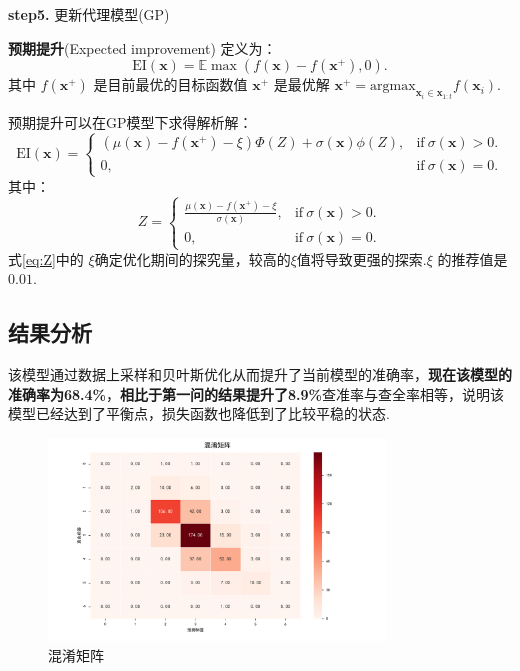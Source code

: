 \documentclass{whutmod}
\begin{document}
\textbf{step5.} 更新代理模型(GP)

	

\textbf{预期提升}(Expected improvement)
定义为：
\begin{equation}
\mathrm{EI}(\mathbf{x}) = \mathbb{E}\max(f(\mathbf{x}) - f(\mathbf{x}^+), 0).
\end{equation}
其中 $f(\mathbf{x}^+)$ 是目前最优的目标函数值 $\mathbf{x}^+$ 是最优解 $\mathbf{x}^+ = \mathrm{argmax}_{\mathbf{x}_i \in \mathbf{x}_{1:t}} f(\mathbf{x}_i)$. 

预期提升可以在GP模型下求得解析解：
\begin{equation}
\mathrm{EI}(\mathbf{x}) =
\begin{cases}
(\mu(\mathbf{x}) - f(\mathbf{x}^+) - \xi)\Phi(Z) + \sigma(\mathbf{x})\phi(Z), &\text{if}\ \sigma(\mathbf{x}) > 0. \\
0,& \text{if}\ \sigma(\mathbf{x}) = 0.
\end{cases}
\end{equation}
其中：
\begin{equation}
Z =
\begin{cases}
\frac{\mu(\mathbf{x}) - f(\mathbf{x}^+) - \xi}{\sigma(\mathbf{x})}, &\text{if}\ \sigma(\mathbf{x}) > 0. \\
0, & \text{if}\ \sigma(\mathbf{x}) = 0.
\end{cases}
\label{eq:Z}
\end{equation}
式\ref{eq:Z}中的 $\xi$确定优化期间的探究量，较高的$\xi$值将导致更强的探索.$\xi$ 的推荐值是 $0.01$.


\subsection{结果分析}
该模型通过数据上采样和贝叶斯优化从而提升了当前模型的准确率，\textbf{现在该模型的准确率为}\textbf{68.4\%}，\textbf{相比于第一问的结果提升}\textbf{了8.9\%}查准率与查全率相等，说明该模型已经达到了平衡点，损失函数也降低到了比较平稳的状态.


\begin{figure}[!h]
	\centering
	\includegraphics[width=0.8\textwidth]{cm3.pdf}
	\caption{混淆矩阵}
\end{figure}
\end{document}
